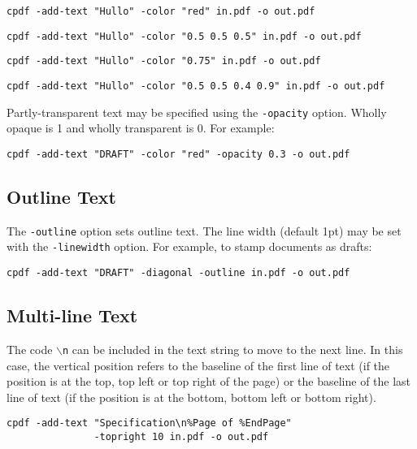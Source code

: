 \documentclass{book}
\begin{document}
  \begin{framed}
    \small\verb!cpdf -add-text "Hullo" -color "red" in.pdf -o out.pdf!
    
    \vspace{1.5mm}
    \small\verb!cpdf -add-text "Hullo" -color "0.5 0.5 0.5" in.pdf -o out.pdf!

    \vspace{1.5mm}
    \small\verb!cpdf -add-text "Hullo" -color "0.75" in.pdf -o out.pdf!

    \vspace{1.5mm}
    \small\verb!cpdf -add-text "Hullo" -color "0.5 0.5 0.4 0.9" in.pdf -o out.pdf!
  \end{framed}

\noindent Partly-transparent text may be specified using the \verb!-opacity! option. Wholly opaque is 1 and wholly transparent is 0. For example:

\begin{framed}
  \small\verb!cpdf -add-text "DRAFT" -color "red" -opacity 0.3 -o out.pdf!
\end{framed}

\subsection{Outline Text}

  The \texttt{-outline} option sets outline text. The line width (default 1pt)
  may be set with the \texttt{-linewidth} option. For example, to stamp
  documents as drafts:

  \begin{framed}
    \small\verb!cpdf -add-text "DRAFT" -diagonal -outline in.pdf -o out.pdf!
    
  \end{framed}

\subsection{Multi-line Text}

The code \texttt{$\backslash$n} can be included in the text string to move to
the next line. In this case, the vertical position refers to the baseline of
the first line of text (if the position is at the top, top left or top right of
the page) or the baseline of the last line of text (if the position is at the
bottom, bottom left or bottom right).

  \begin{framed}
    \small\begin{verbatim}cpdf -add-text "Specification\n%Page of %EndPage"
               -topright 10 in.pdf -o out.pdf\end{verbatim}
  \end{framed}
\end{document}
